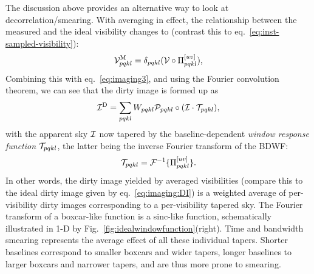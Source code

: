 \documentclass[useAMS,usenatbib]{mn2e}
\begin{document}
The discussion above provides an alternative way to look at decorrelation/smearing. With averaging in effect, the relationship between the measured and the ideal visibility changes to (contrast this to eq.~\ref{eq:inst-sampled-visibility}): 
\begin{equation}
\mathcal{V}^\mathrm{M}_{pqkl} = \delta_{pqkl} ( \mathcal{V}\circ\Pi^{[uv]}_{pqkl} ),
\end{equation} 
Combining this with eq.~\ref{eq:imaging3}, and using the Fourier convolution theorem, we can see that the dirty image is formed up as
\begin{equation}
\mathcal{I}^\mathrm{D} =  \sum_{pqkl} W_{pqkl} \mathcal{P}_{pqkl} \circ (\mathcal{I}\cdot\mathcal{T}_{pqkl}),
\end{equation}
with the apparent sky $\mathcal{I}$ now tapered by the baseline-dependent \emph{window response function} $\mathcal{T}_{pqkl}$, the latter being the inverse Fourier transform of the BDWF:
\begin{equation}
\mathcal{T}_{pqkl} = \mathcal{F}^{-1}\{ \Pi^{[uv]}_{pqkl} \}.
\end{equation}
In other words, the dirty image yielded by averaged visibilities 
(compare this to the ideal dirty image given by eq.~\ref{eq:imaging:DI})
is a weighted average of per-visibility dirty images corresponding to a per-visibility tapered sky. The Fourier transform of a boxcar-like function is a sinc-like function, schematically illustrated in 1-D by Fig.~\ref{fig:idealwindowfunction}(right). Time and bandwidth smearing represents the average effect 
of all these individual tapers. Shorter baselines correspond to smaller boxcars and wider tapers, longer baselines to larger 
boxcars and narrower tapers, and are thus more prone to smearing.
\end{document}
